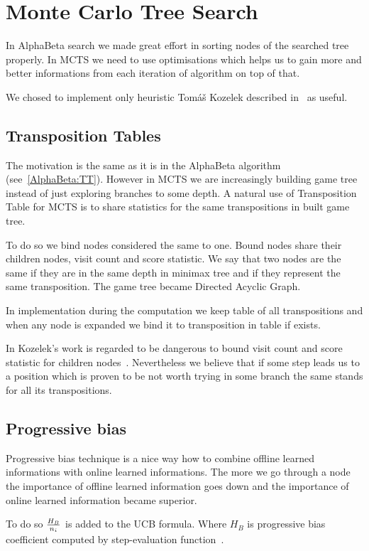 \section{Monte Carlo Tree Search}
In AlphaBeta search we made great effort in sorting nodes of the searched tree
properly. In MCTS we need to use optimisations which helps us to gain more and
better informations from each iteration of algorithm on top of that.

We chosed to implement only heuristic Tomáš Kozelek described in~\cite{KOZELEK}
as useful.

\subsection{Transposition Tables}
The motivation is the same as it is in the AlphaBeta algorithm
(see~\ref{AlphaBeta:TT}). However in MCTS we are increasingly building game
tree instead of just exploring branches to some depth. A natural use of
Transposition Table for MCTS is to share statistics for the same transpositions
in built game tree.

To do so we bind nodes considered the same to one. Bound nodes share their
children nodes, visit count and score statistic. We say that two nodes are the
same if they are in the same depth in minimax tree and if they represent the
same transposition. The game tree became Directed Acyclic Graph.

In implementation during the computation we keep table of all transpositions
and when any node is expanded we bind it to transposition in table if exists.

In Kozelek's work is regarded to be dangerous to bound visit count and score
statistic for children nodes~\cite{KOZELEK}. Nevertheless we believe that if
some step leads us to a position which is proven to be not worth trying in some
branch the same stands for all its transpositions.

\subsection{Progressive bias}
Progressive bias technique is a nice way how to combine offline learned
informations with online learned informations. The more we go through a node
the importance of offline learned information goes down and the importance of
online learned information became superior.

To do so ${H_B \over n_i}$ is added to the UCB formula. Where $H_B$ is
progressive bias coefficient computed by step-evaluation
function~\cite{progressive-strategies}.

